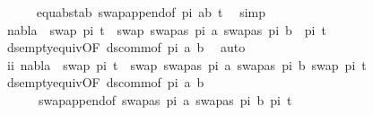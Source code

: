 \begin{isabellebody}
\ \ \ \ \isamarkupfalse%
\ equ{\isacharunderscore}{\kern0pt}abst{\isacharunderscore}{\kern0pt}ab{\isacharparenleft}{\kern0pt}{}{\isacharparenright}{\kern0pt}\ swap{\isacharunderscore}{\kern0pt}append{\isacharbrackleft}{\kern0pt}of\ pi\ {\isacartoucheopen}{\isacharbrackleft}{\kern0pt}{\isacharparenleft}{\kern0pt}a{\isacharcomma}{\kern0pt}b{\isacharparenright}{\kern0pt}{\isacharbrackright}{\kern0pt}{\isacartoucheclose}\ t{}{\isacharprime}{\kern0pt}{\isacharbrackright}{\kern0pt}\ \isamarkupfalse%
\ simp\isanewline
\ \ \isamarkupfalse%
\ \isamarkupfalse%
\ {\isachardoublequoteopen}nabla\ {\isasymturnstile}\ swap\ pi\ t{}{\isacharprime}{\kern0pt}\ {\isasymapprox}\ swap\ {\isacharparenleft}{\kern0pt}{\isacharbrackleft}{\kern0pt}{\isacharparenleft}{\kern0pt}swapas\ pi\ a{\isacharcomma}{\kern0pt}\ swapas\ pi\ b{\isacharparenright}{\kern0pt}{\isacharbrackright}{\kern0pt}\ {\isacharat}{\kern0pt}\ pi{\isacharparenright}{\kern0pt}\ t{}{\isacharprime}{\kern0pt}{\isachardoublequoteclose}\isanewline
\ \ \ \ \isamarkupfalse%
\ ds{\isacharunderscore}{\kern0pt}empty{\isacharunderscore}{\kern0pt}equiv{\isacharunderscore}{\kern0pt}{}{\isacharbrackleft}{\kern0pt}OF\ ds{\isacharunderscore}{\kern0pt}comm{\isacharbrackleft}{\kern0pt}of\ pi\ a\ b{\isacharbrackright}{\kern0pt}{\isacharbrackright}{\kern0pt}\ \isamarkupfalse%
\ auto\isanewline
\ \ \isamarkupfalse%
\ \isamarkupfalse%
\ ii{\isacharcolon}{\kern0pt}\ {\isachardoublequoteopen}nabla\ {\isasymturnstile}\ swap\ pi\ t{}{\isacharprime}{\kern0pt}\ {\isasymapprox}\ swap\ {\isacharbrackleft}{\kern0pt}{\isacharparenleft}{\kern0pt}swapas\ pi\ a{\isacharcomma}{\kern0pt}\ swapas\ pi\ b{\isacharparenright}{\kern0pt}{\isacharbrackright}{\kern0pt}\ {\isacharparenleft}{\kern0pt}swap\ pi\ t{}{\isacharprime}{\kern0pt}{\isacharparenright}{\kern0pt}{\isachardoublequoteclose}\isanewline
\ \ \ \ \isamarkupfalse%
\ ds{\isacharunderscore}{\kern0pt}empty{\isacharunderscore}{\kern0pt}equiv{\isacharunderscore}{\kern0pt}{}{\isacharbrackleft}{\kern0pt}OF\ ds{\isacharunderscore}{\kern0pt}comm{\isacharbrackleft}{\kern0pt}of\ pi\ a\ b{\isacharbrackright}{\kern0pt}{\isacharbrackright}{\kern0pt}\ \isanewline
\ \ \ \ \ \ swap{\isacharunderscore}{\kern0pt}append{\isacharbrackleft}{\kern0pt}of\ {\isacartoucheopen}{\isacharbrackleft}{\kern0pt}{\isacharparenleft}{\kern0pt}swapas\ pi\ a{\isacharcomma}{\kern0pt}\ swapas\ pi\ b{\isacharparenright}{\kern0pt}{\isacharbrackright}{\kern0pt}{\isacartoucheclose}\ pi\ t{}{\isacharprime}{\kern0pt}{\isacharbrackright}{\kern0pt}\ \isamarkupfalse%

\end{isabellebody}

